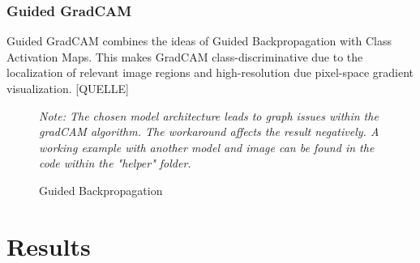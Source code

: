 \documentclass{article}
\begin{document}
\subsubsection{Guided GradCAM}
Guided GradCAM combines the ideas of Guided Backpropagation with Class Activation Maps.
This makes GradCAM class-discriminative due to the localization of relevant image regions and high-resolution due pixel-space gradient visualization. [QUELLE]
\begin{figure}[H]
  \centering
  \hspace{0.5cm}
  \hspace{0.5cm}
  \caption{Guided Backpropagation}
  \small \textit{{Note: The chosen model architecture leads to graph issues within the gradCAM algorithm. The workaround affects the result negatively.
  A working example with another model and image can be found in the code within the "helper" folder.}}
\end{figure}

\section{Results}
\end{document}
